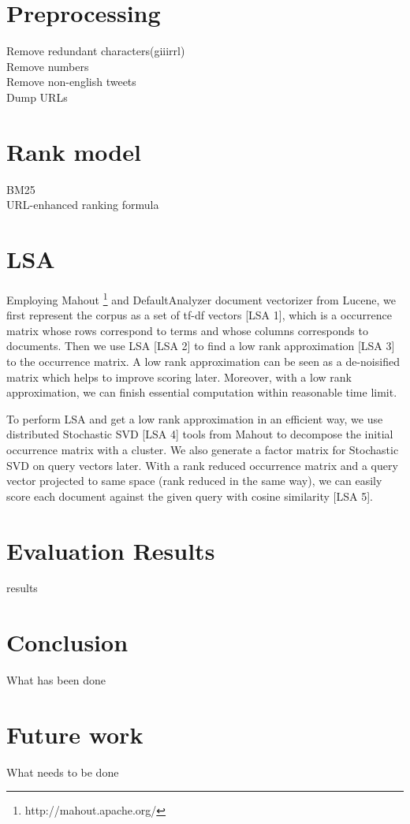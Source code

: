 \documentclass{acm_proc_article-sp}
\begin{document}
\section{Preprocessing}
Remove redundant characters(giiirrl)\\
Remove numbers\\
Remove non-english tweets\\
Dump URLs\\

\section{Rank model}
BM25\\
URL-enhanced ranking formula

\section{LSA}
Employing Mahout \footnote{http://mahout.apache.org/} and DefaultAnalyzer document vectorizer from Lucene, we first represent the corpus as a set of tf-df vectors [LSA 1], which is a occurrence matrix whose rows correspond to terms and whose columns corresponds to documents. Then we use LSA [LSA 2] to find a low rank approximation [LSA 3] to the occurrence matrix. A low rank approximation can be seen as a de-noisified matrix which helps to improve scoring later. Moreover, with a low rank approximation, we can finish essential computation within reasonable time limit.

To perform LSA and get a low rank approximation in an efficient way, we use distributed Stochastic SVD [LSA 4] tools from Mahout to decompose the initial occurrence matrix with a cluster. We also generate a factor matrix for Stochastic SVD on query vectors later. With a rank reduced occurrence matrix and a query vector projected to same space (rank reduced in the same way), we can easily score each document against the given query with cosine similarity [LSA 5].

\section{Evaluation Results}
results\\

\section{Conclusion}
What has been done 

\section{Future work}
What needs to be done
\end{document}
